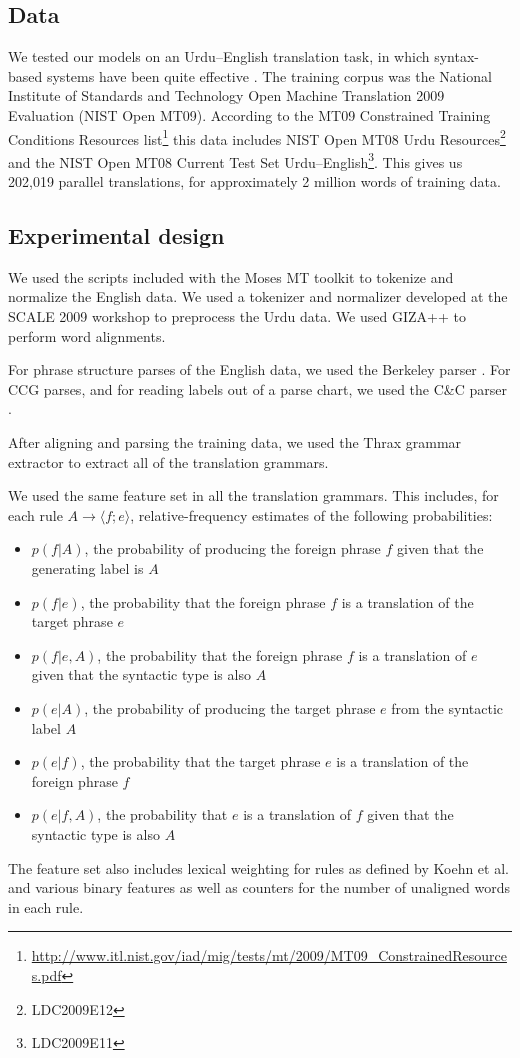 \documentclass[a4paper]{article}
\begin{document}
\subsection{Data}

We tested our models on an Urdu--English translation task, in which syntax-based systems have been quite effective \cite{scale09,zollmann+etal:2008:coling}. The training corpus was the National Institute of Standards and Technology Open Machine Translation 2009 Evaluation (NIST Open MT09). According to the MT09 Constrained Training Conditions Resources list\footnote{\url{http://www.itl.nist.gov/iad/mig/tests/mt/2009/MT09_ConstrainedResources.pdf}} this data includes NIST Open MT08 Urdu Resources\footnote{LDC2009E12} and the NIST Open MT08 Current Test Set Urdu--English\footnote{LDC2009E11}. This gives us 202,019 parallel translations, for approximately 2 million words of training data.

\subsection{Experimental design}

We used the scripts included with the Moses MT toolkit \cite{moses} to tokenize and normalize the English data. We used a tokenizer and normalizer developed at the SCALE 2009 workshop \cite{scale09} to preprocess the Urdu data. We used GIZA++ \cite{giza} to perform word alignments.

For phrase structure parses of the English data, we used the Berkeley parser \cite{Petrov-Klein-Inference}. For CCG parses, and for reading labels out of a parse chart, we used the C\&C parser \cite{candc}.

After aligning and parsing the training data, we used the Thrax grammar extractor \cite{joshua3} to extract all of the translation grammars.

We used the same feature set in all the translation grammars. This includes, for each rule $A \to \langle f ; e \rangle$, relative-frequency estimates of the following probabilities:
\begin{itemize}
\item $p(f|A)$, the probability of producing the foreign phrase $f$ given that the generating label is $A$
\item $p(f|e)$, the probability that the foreign phrase $f$ is a translation of the target phrase $e$
\item $p(f|e,A)$, the probability that the foreign phrase $f$ is a translation of $e$ given that the syntactic type is also $A$
\item $p(e|A)$, the probability of producing the target phrase $e$ from the syntactic label $A$
\item $p(e|f)$, the probability that the target phrase $e$ is a translation of the foreign phrase $f$
\item $p(e|f,A)$, the probability that $e$ is a translation of $f$ given that the syntactic type is also $A$
\end{itemize}
The feature set also includes lexical weighting for rules as defined by Koehn et al.  and various binary features as well as counters for the number of unaligned words in each rule.
\end{document}
